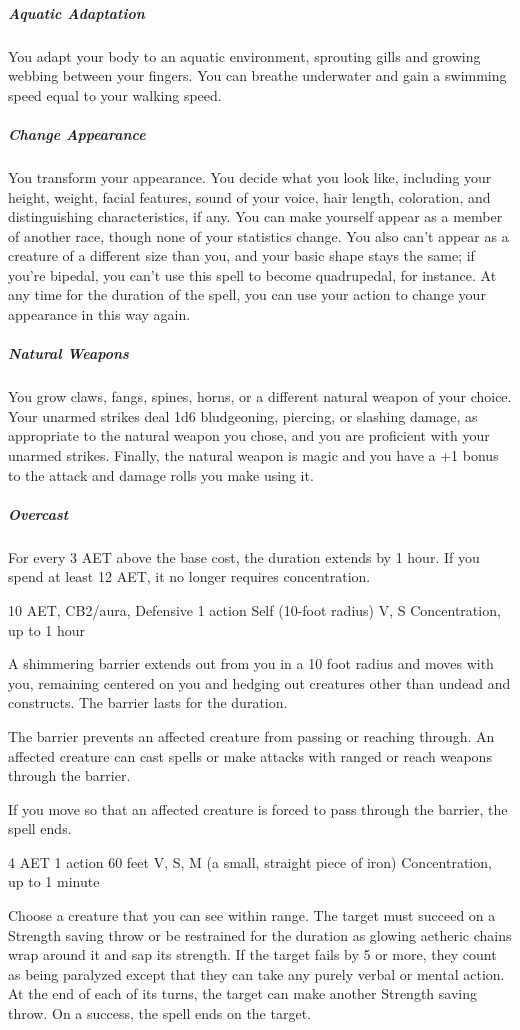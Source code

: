 \subparagraph*{Aquatic Adaptation} You adapt your body to an aquatic environment, sprouting gills and growing webbing between your fingers. You can breathe underwater and gain a swimming speed equal to your walking speed.

\subparagraph*{Change Appearance} You transform your appearance. You decide what you look like, including your height, weight, facial features, sound of your voice, hair length, coloration, and distinguishing characteristics, if any. You can make yourself appear as a member of another race, though none of your statistics change. You also can't appear as a creature of a different size than you, and your basic shape stays the same; if you're bipedal, you can't use this spell to become quadrupedal, for instance. At any time for the duration of the spell, you can use your action to change your appearance in this way again.

\subparagraph*{Natural Weapons} You grow claws, fangs, spines, horns, or a different natural weapon of your choice. Your unarmed strikes deal 1d6 bludgeoning, piercing, or slashing damage, as appropriate to the natural weapon you chose, and you are proficient with your unarmed strikes. Finally, the natural weapon is magic and you have a +1 bonus to the attack and damage rolls you make using it.

\subparagraph*{Overcast} For every 3 AET above the base cost, the duration extends by 1 hour. If you spend at least 12 AET, it no longer requires concentration.


{10 AET, CB2/aura, Defensive}
{1 action}
{Self (10-foot radius)}
{V, S}
{Concentration, up to 1 hour}

A shimmering barrier extends out from you in a 10 foot radius and moves with you, remaining centered on you and hedging out creatures other than undead and constructs. The barrier lasts for the duration.

The barrier prevents an affected creature from passing or reaching through. An affected creature can cast spells or make attacks with ranged or reach weapons through the barrier.

If you move so that an affected creature is forced to pass through the barrier, the spell ends.

{4 AET}
{1 action}
{60 feet}
{V, S, M (a small, straight piece of iron)}
{Concentration, up to 1 minute}

Choose a creature that you can see within range. The target must succeed on a Strength saving throw or be restrained for the duration as glowing aetheric chains wrap around it and sap its strength. If the target fails by 5 or more, they count as being paralyzed except that they can take any purely verbal or mental action. At the end of each of its turns, the target can make another Strength saving throw. On a success, the spell ends on the target.

